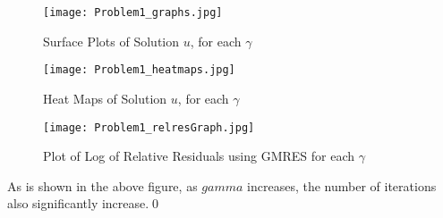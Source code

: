 \documentclass[12pt]{article}
\begin{document}
\begin{figure}[H]
\center
\texttt{[image: Problem1\_graphs.jpg]}
\caption{Surface Plots of Solution $u$, for each $\gamma$}
\end{figure}

\begin{figure}[H]
\center
\texttt{[image: Problem1\_heatmaps.jpg]}
\caption{Heat Maps of Solution $u$, for each $\gamma$}
\end{figure}

\begin{figure}[H]
\center
\texttt{[image: Problem1\_relresGraph.jpg]}
\caption{Plot of Log of Relative Residuals using GMRES for each $\gamma$}
\end{figure}
\noindent
As is shown in the above figure, as $gamma$ increases, the number of iterations also significantly increase.\qed\\


\newpage
\end{document}

